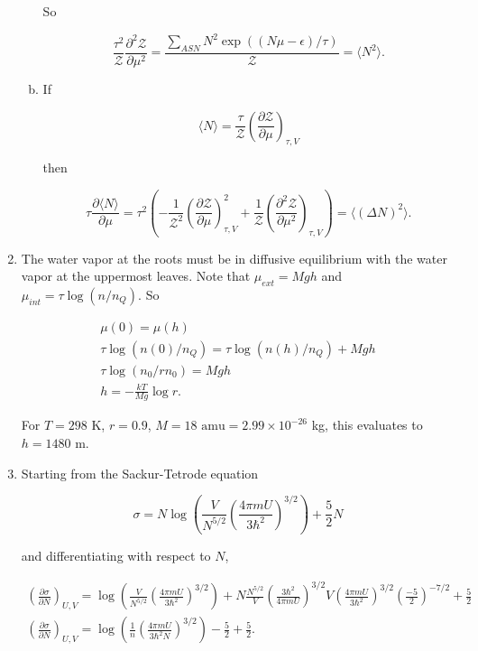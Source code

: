 \documentclass{article}
\begin{document}
\begin{enumerate}
\begin{enumerate}[(a)]
		So 

		$$\frac{\tau^2}{\mathcal{Z}} \frac{\partial^2 \mathcal{Z}}{\partial \mu^2} = \frac{\sum \limits_{ASN} N^2 \exp ((N\mu - \epsilon) / \tau)}{\mathcal{Z}} = \langle N^2 \rangle.$$

		\item

		If 

		$$\langle N \rangle = \frac{\tau}{\mathcal{Z}} \left( \frac{\partial \mathcal{Z}}{\partial \mu} \right)_{\tau, V} $$

		then 

		$$\tau \frac{\partial \langle N \rangle}{\partial \mu} = \tau^2 \left( -\frac{1}{\mathcal{Z}^2} \left( \frac{\partial \mathcal{Z}}{\partial \mu} \right)_{\tau, V}^2 + \frac{1}{\mathcal{Z}} \left( \frac{\partial^2 \mathcal{Z}}{\partial \mu^2} \right)_{\tau, V} \right) = \langle (\Delta N)^2 \rangle.$$


	\end{enumerate}

	\item

	The water vapor at the roots must be in diffusive equilibrium with the water vapor at the uppermost leaves. Note that $\mu_{ext} = Mgh$ and $\mu_{int} = \tau \log (n / n_Q)$. So

	\begin{gather*}
	\mu(0) = \mu(h) \\
	\tau \log (n(0) / n_Q) = \tau \log(n(h) / n_Q) + Mgh \\
	\tau \log(n_0 / rn_0) = Mgh \\
	h = - \frac{kT}{Mg} \log r.
	\end{gather*}

	For $T = 298$ K, $r = 0.9$, $M = 18 \text{ amu} = 2.99 \times 10^{-26}$ kg, this evaluates to $h = 1480$ m.

	\item

	Starting from the Sackur-Tetrode equation

	$$\sigma = N\log \left( \frac{V}{N^{5/2}} \left(\frac{4 \pi m U}{3 \hbar^2} \right)^{3/2} \right) + \frac{5}{2}N$$

	and differentiating with respect to $N$,

	\begin{gather*}
	\left(\frac{\partial \sigma}{\partial N}\right)_{U,V} = \log \left( \frac{V}{N^{5/2}} \left(\frac{4 \pi m U}{3 \hbar^2} \right)^{3/2} \right) + N \frac{N^{5/2}}{V} \left(\frac{3 \hbar^2}{4 \pi m U} \right)^{3/2} V \left( \frac{4 \pi m U}{3 \hbar^2}\right)^{3/2} \left(\frac{-5}{2} \right)^{-7/2} + \frac{5}{2} \\
	\left(\frac{\partial \sigma}{\partial N}\right)_{U,V} = \log \left(\frac{1}{n} \left( \frac{4 \pi m U}{3 \hbar^2 N} \right)^{3/2} \right) - \frac{5}{2} + \frac{5}{2}.
	\end{gather*}


\end{enumerate}
\end{document}
